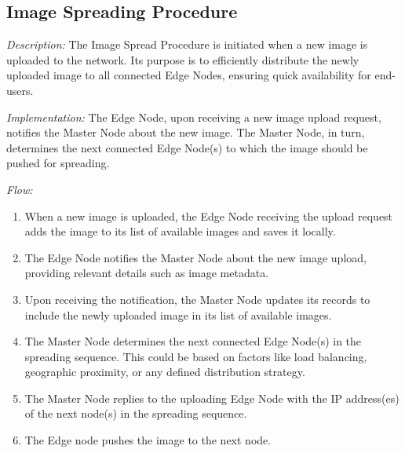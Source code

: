 \documentclass{article}
\begin{document}
  \newpage







  \subsection{Image Spreading Procedure}

  \textit{Description:} The Image Spread Procedure is initiated when a new image is uploaded to the network. Its
  purpose is to efficiently distribute the newly uploaded image to all connected Edge Nodes, ensuring quick
  availability for end-users.

  \textit{Implementation:} The Edge Node, upon receiving a new image upload request, notifies the Master Node about
  the new image. The Master Node, in turn, determines the next connected Edge Node(s) to which the image
  should be pushed for spreading.

  \textit{Flow:}
  \begin{enumerate}[label=\arabic*.]
    \item When a new image is uploaded, the Edge Node receiving the upload request adds the image to its
    list of available images and saves it locally.

    \item The Edge Node notifies the Master Node about the new image upload, providing relevant details such
     as image metadata.

    \item Upon receiving the notification, the Master Node updates its records to include the newly
    uploaded image in its list of available images.

    \item The Master Node determines the next connected Edge Node(s) in the spreading sequence.
    This could be based on factors like load balancing, geographic proximity, or any defined distribution strategy.

    \item The Master Node replies to the uploading Edge Node with the IP address(es) of the next node(s)
    in the spreading sequence.

    \item The Edge node pushes the image to the next node.
  \end{enumerate}
\end{document}
